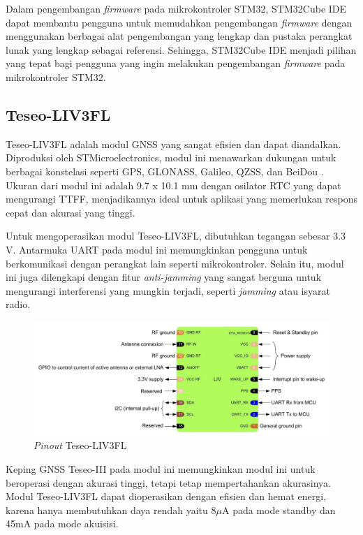 Dalam pengembangan \textit{firmware} pada mikrokontroler STM32, STM32Cube IDE dapat membantu pengguna untuk memudahkan pengembangan \textit{firmware} dengan menggunakan berbagai alat pengembangan yang lengkap dan pustaka perangkat lunak yang lengkap sebagai referensi. Sehingga, STM32Cube IDE menjadi pilihan yang tepat bagi pengguna yang ingin melakukan pengembangan \textit{firmware} pada mikrokontroler STM32.

\subsection{Teseo-LIV3FL}
Teseo-LIV3FL adalah modul GNSS yang sangat efisien dan dapat diandalkan. Diproduksi oleh STMicroelectronics, modul ini menawarkan dukungan untuk berbagai konstelasi seperti GPS, GLONASS, Galileo, QZSS, dan BeiDou \cite{STMicroelectronics2022}. Ukuran dari modul ini adalah 9.7 x 10.1 mm dengan osilator RTC yang dapat mengurangi TTFF, menjadikannya ideal untuk aplikasi yang memerlukan respons cepat dan akurasi yang tinggi.

Untuk mengoperasikan modul Teseo-LIV3FL, dibutuhkan tegangan sebesar 3.3 V. Antarmuka UART pada modul ini memungkinkan pengguna untuk berkomunikasi dengan perangkat lain seperti mikrokontroler. Selain itu, modul ini juga dilengkapi dengan fitur \textit{anti-jamming} yang sangat berguna untuk mengurangi interferensi yang mungkin terjadi, seperti \textit{jamming} atau isyarat radio.

\begin{figure}[H]
	\centering
	\includegraphics[width=13cm]{contents/chapter-2/teseo_pinout.png}
	\caption{\textit{Pinout} Teseo-LIV3FL \cite{STMicroelectronics2022a}}
	\label{Fig: teseo_pinout}
\end{figure}

Keping GNSS Teseo-III pada modul ini memungkinkan modul ini untuk beroperasi dengan akurasi tinggi, tetapi tetap mempertahankan akurasinya. Modul Teseo-LIV3FL dapat dioperasikan dengan efisien dan hemat energi, karena hanya membutuhkan daya rendah yaitu 8$\mu$A pada mode standby dan 45mA pada mode akuisisi.

